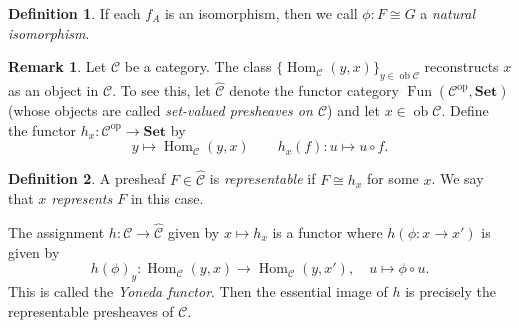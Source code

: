 \documentclass[10pt,letterpaper,cm]{nupset}
\theoremstyle{definition}
\newtheorem*{definition}{Definition}
\newtheorem{remark}{Remark}
\newcommand{\1}{\mathbf{1}}
\renewcommand{\c}{\mathscr{C}}
\newcommand{\0}{\vec 0}
\DeclareMathOperator{\op}{op}
\DeclareMathOperator{\ob}{ob}
\DeclareMathOperator{\Hom}{Hom}
\DeclareMathOperator{\Fun}{Fun}
\begin{document}
\begin{definition}
If each $f_A$ is an isomorphism, then we call $\phi: F \cong G$ a \textit{natural isomorphism}.
\end{definition}

\begin{remark}
 Let $\c$ be a category.  The class $\{\Hom_{\c}(y, x)\}_{y\in \ob \c}$ reconstructs $x$ as an object in $\c$. To see this, let $\widehat{\c}$ denote the functor category $\Fun(\c^{\op}, \mathbf{Set})$ (whose objects are called \textit{set-valued presheaves on $\c$})  and let $x \in \ob \c$. Define the functor $h_x : \c^{\op} \to \mathbf{Set}$ by $$y \mapsto \Hom_{\c}(y, x) \quad \quad h_x(f) : u \mapsto u \circ f.$$ 
\begin{definition}
A presheaf $F \in \widehat{\c}$ is \textit{representable} if $F \cong h_x$ for some $x$. We say that \textit{$x$ represents $F$} in this case.
\end{definition}
The assignment $h: \c \to \widehat{\c}$ given by $x \mapsto h_x$ is a functor where $h(\phi : x \to x')$ is given by $$h(\phi)_y : \Hom_{\c}(y, x) \to \Hom_{\c}(y, x'), \quad u \mapsto \phi \circ u.$$ This is called the \textit{Yoneda functor}. Then the essential image of $h$ is precisely the representable presheaves of $\c$.
\end{remark}
\end{document}
